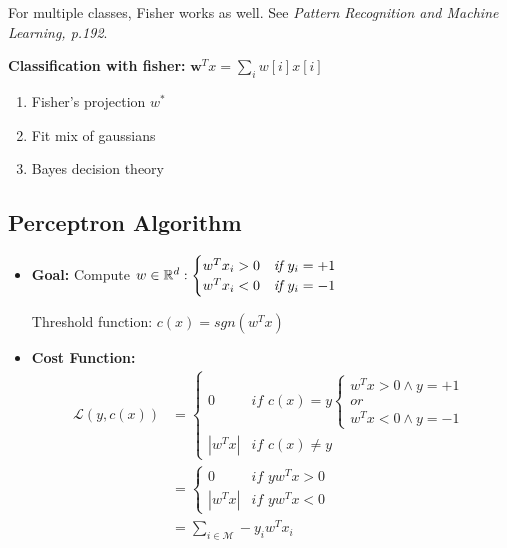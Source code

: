 For multiple classes, Fisher works as well. See \textit{Pattern Recognition and Machine Learning, p.192}.

\textbf{Classification with fisher: } $\mathbf w^Tx = \sum_iw[i]x[i]$
\begin{enumerate}
	\item Fisher's projection $w^*$
	\item Fit mix of gaussians
	\item Bayes decision theory
\end{enumerate}


\subsection{Perceptron Algorithm}
\begin{itemize}[leftmargin=*]
	\item \textbf{ Goal:} Compute $w\in\mathbb R^d: \begin{cases}
		w^Tx_i > 0 & \textit{if } y_i = +1 \\
		w^Tx_i < 0 & \textit{if } y_i = -1
	\end{cases}$
	
	Threshold function: $c(x)= \textit{sgn}(w^Tx)$
	\item \textbf{Cost Function: }
	\begin{align*}
		\mathcal L(y, c(x)) &= \begin{cases}
			0 & \textit{if } c(x) = y \begin{cases}
											w^Tx > 0 \land y = +1 \\ 
											\textit{or }\\
											w^Tx < 0 \land y = -1 
										\end{cases} \\
			|w^Tx| & \textit{if } c(x) \neq y
		\end{cases} \\
		 &= \begin{cases}
			0 & \textit{if } yw^Tx > 0 \\
			|w^Tx| & \textit{if } yw^Tx < 0
		\end{cases} \\
		&= \sum_{i\in \mathcal M}-y_iw^Tx_i
	\end{align*}
\end{itemize}

